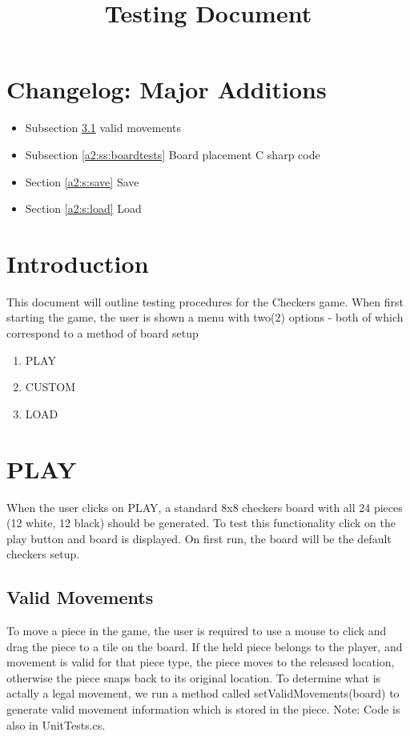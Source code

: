 \documentclass{article}
\title{\bf Testing Document}
\date{\vspace{-5ex}}
\begin{document}
\maketitle
\tableofcontents

\section{Changelog: Major Additions}
\begin{itemize}
\item Subsection \ref{a2:ss:valid} valid movements
\item Subsection \ref{a2:ss:boardtests} Board placement C sharp code
\item Section \ref{a2:s:save} Save
\item Section \ref{a2:s:load} Load
\end{itemize}


\section{Introduction}
This document will outline testing procedures for the Checkers game. When first starting the game, the user is shown a menu with two(2) options - both of which correspond to a method of board setup 
\begin{enumerate}
\item PLAY
\item CUSTOM
\item LOAD
\end{enumerate}

\section{PLAY}
When the user clicks on PLAY, a standard 8x8 checkers board with all 24 pieces (12 white, 12 black) should be generated.
To test this functionality click on the play button and board is displayed. On first run, the board will be the default checkers setup.

\subsection{Valid Movements} \label{a2:ss:valid}
To move a piece in the game, the user is required to use a mouse to click and drag the piece to a tile on the board.
If the held piece belongs to the player, and movement is valid for that piece type, the piece moves to the released location, otherwise the piece snaps back to its original location.
To determine what is actally a legal movement, we run a method called setValidMovements(board) to generate valid movement information which is stored in the piece.
Note: Code is also in UnitTests.cs.
\end{document}

